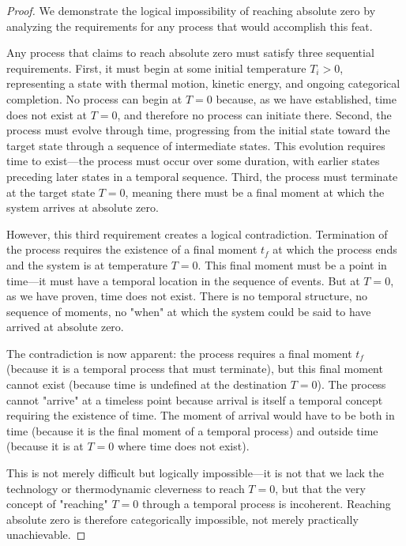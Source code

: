 \documentclass[12pt,a4paper]{article}
\theoremstyle{definition}
\theoremstyle{remark}
\begin{document}
\begin{proof}
We demonstrate the logical impossibility of reaching absolute zero by analyzing the requirements for any process that would accomplish this feat.

Any process that claims to reach absolute zero must satisfy three sequential requirements. First, it must begin at some initial temperature $T_i > 0$, representing a state with thermal motion, kinetic energy, and ongoing categorical completion. No process can begin at $T = 0$ because, as we have established, time does not exist at $T = 0$, and therefore no process can initiate there. Second, the process must evolve through time, progressing from the initial state toward the target state through a sequence of intermediate states. This evolution requires time to exist—the process must occur over some duration, with earlier states preceding later states in a temporal sequence. Third, the process must terminate at the target state $T = 0$, meaning there must be a final moment at which the system arrives at absolute zero.

However, this third requirement creates a logical contradiction. Termination of the process requires the existence of a final moment $t_f$ at which the process ends and the system is at temperature $T = 0$. This final moment must be a point in time—it must have a temporal location in the sequence of events. But at $T = 0$, as we have proven, time does not exist. There is no temporal structure, no sequence of moments, no "when" at which the system could be said to have arrived at absolute zero.

The contradiction is now apparent: the process requires a final moment $t_f$ (because it is a temporal process that must terminate), but this final moment cannot exist (because time is undefined at the destination $T = 0$). The process cannot "arrive" at a timeless point because arrival is itself a temporal concept requiring the existence of time. The moment of arrival would have to be both in time (because it is the final moment of a temporal process) and outside time (because it is at $T = 0$ where time does not exist).

This is not merely difficult but logically impossible—it is not that we lack the technology or thermodynamic cleverness to reach $T = 0$, but that the very concept of "reaching" $T = 0$ through a temporal process is incoherent. Reaching absolute zero is therefore categorically impossible, not merely practically unachievable.
\end{proof}
\end{document}
